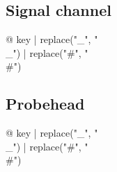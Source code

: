 \begin{multicols}{2}
\subsection{Signal channel}

\begin{description}
\item[{@ key | replace("_", "\\_") | replace("#", "\\#") }] %
\end{description}

\subsection{Probehead}

\begin{description}
\item[{@ key | replace("_", "\\_") | replace("#", "\\#") }] %
\end{description}

\end{multicols}